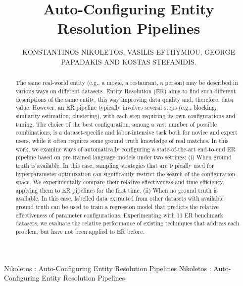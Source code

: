 \documentclass{ieeeaccess}
\begin{document}

\title{Auto-Configuring Entity Resolution Pipelines}
\author{\uppercase{Konstantinos Nikoletos}, \uppercase{Vasilis Efthymiou, George Papadakis and Kostas Stefanidis}.}
\address[1]{National and Kappodistrian University of Athens, Athens, Greece (email: k.nikoletos@di.uoa.gr)}
\address[2]{Harokopio University of Athens, Athens, Greece (email: vefthym@hua.gr)}
\address[3]{National and Kappodistrian University of Athens, Athens, Greece (email: gpapadis@di.uoa.gr)}
\address[4]{Tampere University, Tampere, Finland (e-mail: konstantinos.stefanidis@tuni.fi)}

\markboth
{Nikoletos \headeretal: Auto-Configuring Entity Resolution Pipelines}
{Nikoletos \headeretal: Auto-Configuring Entity Resolution Pipelines}


\begin{abstract}
The same real-world entity (e.g., a movie, a restaurant, a person) may be described in various ways on different datasets. Entity Resolution (ER) aims to find such different descriptions of the same entity, this way improving data quality and, therefore, data value. However, an ER pipeline typically involves several steps (e.g., blocking, similarity estimation, clustering), with each step requiring its own configurations and tuning. The choice of the best configuration, among a vast number of possible combinations, is a dataset-specific and labor-intensive task both for novice and expert users, while it often requires some ground truth knowledge of real matches. In this work, we examine ways of automatically configuring a state-of-the-art end-to-end ER pipeline based on pre-trained language models under two settings: (i) When ground truth is available. In this case, sampling strategies that are typically used for hyperparameter optimization can significantly restrict the search of the configuration space. We experimentally compare their relative effectiveness and time efficiency, applying them to ER pipelines for the first time. (ii) When no ground truth is available. In this case, labelled data extracted from other datasets with available ground truth can be used to train a regression model that predicts the relative effectiveness of parameter configurations. Experimenting with 11 ER benchmark datasets, we evaluate the relative performance of existing techniques that address each problem, but have not been applied to ER before.
\end{abstract}
\end{document}
